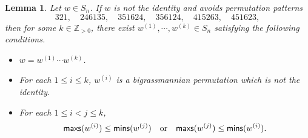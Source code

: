\documentclass[12pt]{amsart}
\newtheorem{lemma}[theorem]{Lemma}
\theoremstyle{definition}
\theoremstyle{remark}
\newcommand{\Z}{\mathbb{Z}}
\begin{document}
\begin{lemma}\label{lem8.1}
Let $w \in S_n$. If $w$ is not the identity and avoids permutation patterns
\begin{equation}\label{eqn8.1}
321, \quad 246135, \quad 351624, \quad 356124, \quad 415263, \quad 451623,
\end{equation}
then for some $k \in \Z_{> 0}$, there exist $w^{(1)} , \cdots , w^{(k)} \in S_n$ satisfying the following conditions.
\begin{itemize}
\item $w = w^{(1)}  \cdots  w^{(k)}$.
\item For each $1 \leq i \leq k$, $w^{(i)}$ is a bigrassmannian permutation which is not the identity.
\item For each $1 \leq i < j \leq k$,
\begin{equation}
{\sf maxs}(w^{(i)}) \leq {\sf mins}(w^{(j)}) \quad \text{or} \quad {\sf maxs}(w^{(j)}) \leq {\sf mins}(w^{(i)}).
\end{equation}
\end{itemize} 
\end{lemma}
\end{document}
